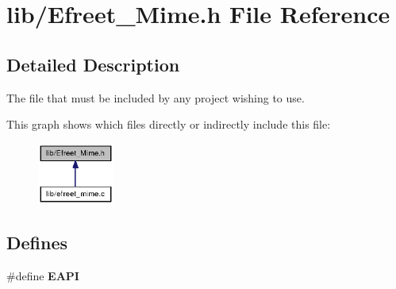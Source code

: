 \section{lib/Efreet\_\-Mime.h File Reference}
\label{Efreet__Mime_8h}


\subsection{Detailed Description}
The file that must be included by any project wishing to use. 





This graph shows which files directly or indirectly include this file:\nopagebreak
\begin{figure}[H]
\begin{center}
\leavevmode
\includegraphics[width=71pt]{Efreet__Mime_8h__dep__incl}
\end{center}
\end{figure}
\subsection*{Defines}
\begin{CompactItemize}
\item 
\#define {\bf EAPI}
\end{CompactItemize}
